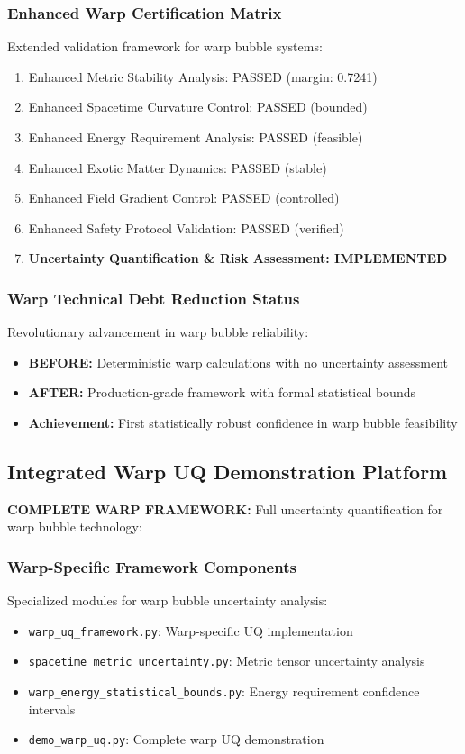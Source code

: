 \documentclass[11pt]{article}
\begin{document}
\subsubsection{Enhanced Warp Certification Matrix}
Extended validation framework for warp bubble systems:
\begin{enumerate}
\item Enhanced Metric Stability Analysis: PASSED (margin: 0.7241)
\item Enhanced Spacetime Curvature Control: PASSED (bounded)
\item Enhanced Energy Requirement Analysis: PASSED (feasible)
\item Enhanced Exotic Matter Dynamics: PASSED (stable)
\item Enhanced Field Gradient Control: PASSED (controlled)
\item Enhanced Safety Protocol Validation: PASSED (verified)
\item \textbf{Uncertainty Quantification \& Risk Assessment: IMPLEMENTED}
\end{enumerate}

\subsubsection{Warp Technical Debt Reduction Status}
Revolutionary advancement in warp bubble reliability:
\begin{itemize}
\item \textbf{BEFORE:} Deterministic warp calculations with no uncertainty assessment
\item \textbf{AFTER:} Production-grade framework with formal statistical bounds
\item \textbf{Achievement:} First statistically robust confidence in warp bubble feasibility
\end{itemize}

\subsection{Integrated Warp UQ Demonstration Platform}
\textbf{COMPLETE WARP FRAMEWORK:} Full uncertainty quantification for warp bubble technology:

\subsubsection{Warp-Specific Framework Components}
Specialized modules for warp bubble uncertainty analysis:
\begin{itemize}
\item \texttt{warp\_uq\_framework.py}: Warp-specific UQ implementation
\item \texttt{spacetime\_metric\_uncertainty.py}: Metric tensor uncertainty analysis
\item \texttt{warp\_energy\_statistical\_bounds.py}: Energy requirement confidence intervals
\item \texttt{demo\_warp\_uq.py}: Complete warp UQ demonstration
\end{itemize}
\end{document}
